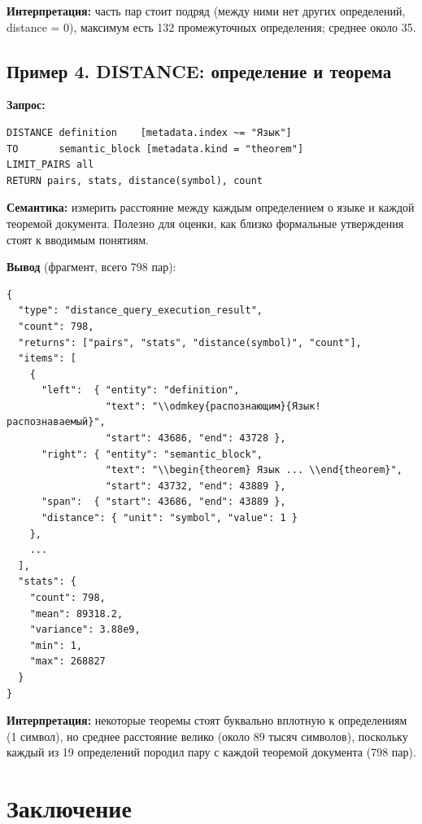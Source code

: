 \documentclass[12pt,a4paper]{article}
\begin{document}
\textbf{Интерпретация:} часть пар стоит подряд (между ними нет других
определений, distance = 0), максимум есть 132 промежуточных
определения; среднее около 35.

\subsection{Пример 4. DISTANCE: определение и теорема}

\textbf{Запрос:}
\begin{Verbatim}[fontsize=\small,frame=single,formatcom=\color{dslkw}]
DISTANCE definition    [metadata.index ~= "Язык"]
TO       semantic_block [metadata.kind = "theorem"]
LIMIT_PAIRS all
RETURN pairs, stats, distance(symbol), count
\end{Verbatim}

\textbf{Семантика:} измерить расстояние между каждым определением о
языке и каждой теоремой документа. Полезно для оценки, как близко
формальные утверждения стоят к вводимым понятиям.

\textbf{Вывод} (фрагмент, всего 798 пар):
\begin{Verbatim}[fontsize=\scriptsize,frame=single]
{
  "type": "distance_query_execution_result",
  "count": 798,
  "returns": ["pairs", "stats", "distance(symbol)", "count"],
  "items": [
    {
      "left":  { "entity": "definition",
                 "text": "\\odmkey{распознающим}{Язык!распознаваемый}",
                 "start": 43686, "end": 43728 },
      "right": { "entity": "semantic_block",
                 "text": "\\begin{theorem} Язык ... \\end{theorem}",
                 "start": 43732, "end": 43889 },
      "span":  { "start": 43686, "end": 43889 },
      "distance": { "unit": "symbol", "value": 1 }
    },
    ...
  ],
  "stats": {
    "count": 798,
    "mean": 89318.2,
    "variance": 3.88e9,
    "min": 1,
    "max": 268827
  }
}
\end{Verbatim}

\textbf{Интерпретация:} некоторые теоремы стоят буквально вплотную
к определениям (1 символ), но среднее расстояние велико (около
89 тысяч символов), поскольку каждый из 19 определений породил пару
с каждой теоремой документа (798 пар).

\section{Заключение}
\end{document}
